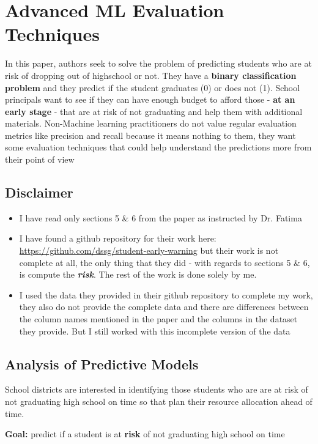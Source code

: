 \documentclass{article}
\begin{document}
\section{Advanced ML Evaluation Techniques}
In this paper, authors seek to solve the problem of predicting students who are at risk of dropping out of highschool or not. They have a \textbf{binary classification problem} and they predict if the student graduates (0) or does not (1). School principals want to see if they can have enough budget to afford those - \textbf{at an early stage} - that are at risk of not graduating and help them with additional materials. Non-Machine learning practitioners do not value regular evaluation metrics like precision and recall because it means nothing to them, they want some evaluation techniques that could help understand the predictions more from their point of view

\subsection*{Disclaimer}
\begin{itemize}
\item I have read only sections 5 \& 6 from the paper as instructed by Dr. Fatima
\item I have found a github repository for their work here: \url{https://github.com/dssg/student-early-warning} but their work is not complete at all, the only thing that they did - with regards to sections 5 \& 6, is compute the \textbf{\textit{risk}}. The rest of the work is done solely by me. 
\item I used the data they provided in their github repository to complete my work, they also do not provide the complete data and there are differences between the column names mentioned in the paper and the columns in the dataset they provide. But I still worked with this incomplete version of the data 
\end{itemize}

\subsection{Analysis of Predictive Models}
School districts are interested in identifying those students who are are at risk of not graduating high school on time so that plan their resource allocation ahead of time.

\noindent \textbf{Goal:} predict if a student is at \textbf{risk} of not graduating high school on time
\end{document}
